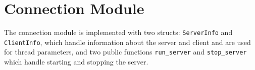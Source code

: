 \section{Connection Module}
The connection module is implemented with two structs: \lstinline|ServerInfo| and \lstinline|ClientInfo|, which handle information about the server and client and are used for thread parameters, and two public functions \lstinline|run_server| and \lstinline|stop_server| which handle starting and stopping the server.